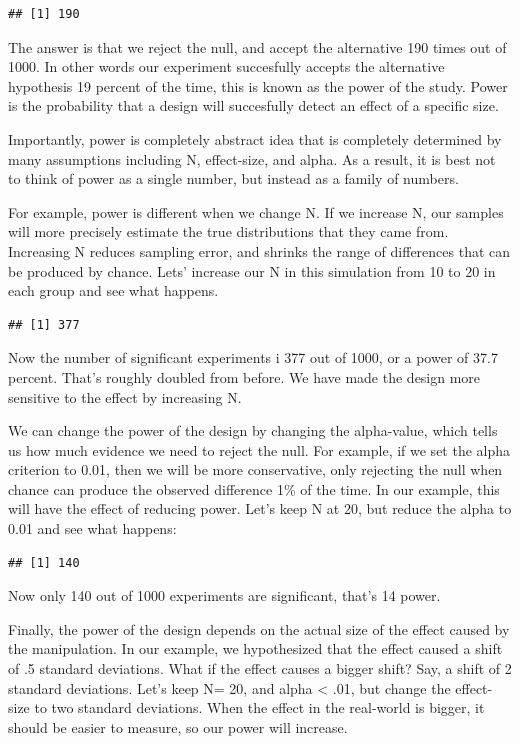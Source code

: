 \documentclass[
]{book}
\begin{document}
\begin{verbatim}
## [1] 190
\end{verbatim}

The answer is that we reject the null, and accept the alternative 190 times out of 1000. In other words our experiment succesfully accepts the alternative hypothesis 19 percent of the time, this is known as the power of the study. Power is the probability that a design will succesfully detect an effect of a specific size.

Importantly, power is completely abstract idea that is completely determined by many assumptions including N, effect-size, and alpha. As a result, it is best not to think of power as a single number, but instead as a family of numbers.

For example, power is different when we change N. If we increase N, our samples will more precisely estimate the true distributions that they came from. Increasing N reduces sampling error, and shrinks the range of differences that can be produced by chance. Lets' increase our N in this simulation from 10 to 20 in each group and see what happens.

\begin{verbatim}
## [1] 377
\end{verbatim}

Now the number of significant experiments i 377 out of 1000, or a power of 37.7 percent. That's roughly doubled from before. We have made the design more sensitive to the effect by increasing N.

We can change the power of the design by changing the alpha-value, which tells us how much evidence we need to reject the null. For example, if we set the alpha criterion to 0.01, then we will be more conservative, only rejecting the null when chance can produce the observed difference 1\% of the time. In our example, this will have the effect of reducing power. Let's keep N at 20, but reduce the alpha to 0.01 and see what happens:

\begin{verbatim}
## [1] 140
\end{verbatim}

Now only 140 out of 1000 experiments are significant, that's 14 power.

Finally, the power of the design depends on the actual size of the effect caused by the manipulation. In our example, we hypothesized that the effect caused a shift of .5 standard deviations. What if the effect causes a bigger shift? Say, a shift of 2 standard deviations. Let's keep N= 20, and alpha \textless{} .01, but change the effect-size to two standard deviations. When the effect in the real-world is bigger, it should be easier to measure, so our power will increase.
\end{document}
